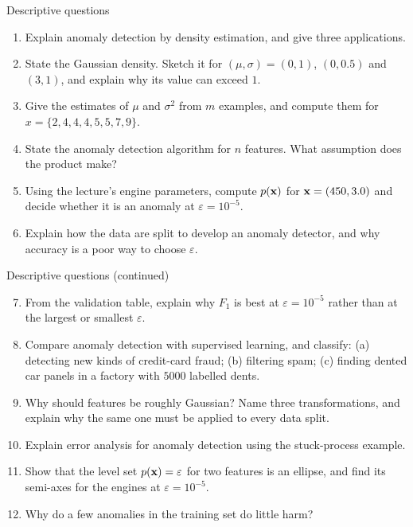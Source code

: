 \documentclass[aspectratio=169,10pt]{beamer}
\begin{document}
\begin{frame}{Descriptive questions}
  \footnotesize
  \begin{enumerate}
    \item Explain anomaly detection by density estimation, and give three applications.
          \hfill{}
    \item State the Gaussian density. Sketch it for $(\mu,\sigma)=(0,1)$, $(0,0.5)$ and
          $(3,1)$, and explain why its value can exceed $1$. \hfill{}
    \item Give the estimates of $\mu$ and $\sigma^2$ from $m$ examples, and compute them for
          $x=\{2,4,4,4,5,5,7,9\}$. \hfill{}
    \item State the anomaly detection algorithm for $n$ features. What assumption does the
          product make? \hfill{}
    \item Using the lecture's engine parameters, compute $p(\mathbf{x})$ for $\mathbf{x}=(450,3.0)$ and
          decide whether it is an anomaly at $\varepsilon=10^{-5}$. \hfill{}
    \item Explain how the data are split to develop an anomaly detector, and why accuracy
          is a poor way to choose $\varepsilon$. \hfill{}
  \end{enumerate}
\end{frame}

\begin{frame}{Descriptive questions (continued)}
  \footnotesize
  \begin{enumerate}\setcounter{enumi}{6}
    \item From the validation table, explain why $F_1$ is best at $\varepsilon=10^{-5}$
          rather than at the largest or smallest $\varepsilon$. \hfill{}
    \item Compare anomaly detection with supervised learning, and classify: (a) detecting
          new kinds of credit-card fraud; (b) filtering spam; (c) finding dented car
          panels in a factory with $5000$ labelled dents. \hfill{}
    \item Why should features be roughly Gaussian? Name three transformations, and explain
          why the same one must be applied to every data split. \hfill{}
    \item Explain error analysis for anomaly detection using the stuck-process example.
          \hfill{}
    \item Show that the level set $p(\mathbf{x})=\varepsilon$ for two features is an ellipse, and
          find its semi-axes for the engines at $\varepsilon=10^{-5}$. \hfill{}
    \item Why do a few anomalies in the training set do little harm? \hfill{}
  \end{enumerate}
\end{frame}
\end{document}
